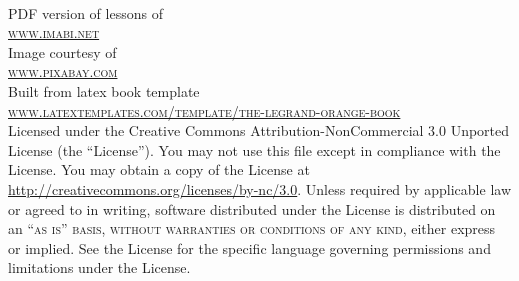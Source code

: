 \documentclass[11pt,fleqn]{book} %
\begin{document}
\newpage
~\vfill
\thispagestyle{empty}

\noindent PDF version of lessons of \\ \textsc{\url{www.imabi.net}} \\ %

\noindent Image courtesy of \\ \textsc{\url{www.pixabay.com}} \\

\noindent Built from latex book template\\ \textsc{\url{www.latextemplates.com/template/the-legrand-orange-book}} \\


\noindent Licensed under the Creative Commons Attribution-NonCommercial 3.0 Unported License (the ``License''). You may not use this file except in compliance with the License. You may obtain a copy of the License at \url{http://creativecommons.org/licenses/by-nc/3.0}. Unless required by applicable law or agreed to in writing, software distributed under the License is distributed on an \textsc{``as is'' basis, without warranties or conditions of any kind}, either express or implied. See the License for the specific language governing permissions and limitations under the License.\\ %



\pagestyle{empty} %

\tableofcontents %


\cleardoublepage %

\pagestyle{fancy} %
\end{document}
